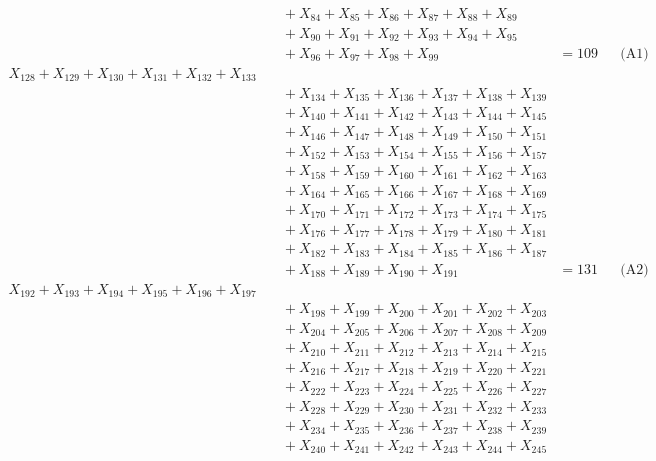 \documentclass[a4paper,10pt]{article}
\begin{document}
{\begin{align}
&\quad  + X_{84} + X_{85} + X_{86} + X_{87} + X_{88} + X_{89} \\[0.5ex]
&\quad  + X_{90} + X_{91} + X_{92} + X_{93} + X_{94} + X_{95} \\[0.5ex]
&\quad  + X_{96} + X_{97} + X_{98} + X_{99} &= 109 && \text{(A1)} \\
X_{128} + X_{129} + X_{130} + X_{131} + X_{132} + X_{133} \\[0.5ex]
&\quad  + X_{134} + X_{135} + X_{136} + X_{137} + X_{138} + X_{139} \\[0.5ex]
&\quad  + X_{140} + X_{141} + X_{142} + X_{143} + X_{144} + X_{145} \\[0.5ex]
&\quad  + X_{146} + X_{147} + X_{148} + X_{149} + X_{150} + X_{151} \\[0.5ex]
&\quad  + X_{152} + X_{153} + X_{154} + X_{155} + X_{156} + X_{157} \\[0.5ex]
&\quad  + X_{158} + X_{159} + X_{160} + X_{161} + X_{162} + X_{163} \\[0.5ex]
&\quad  + X_{164} + X_{165} + X_{166} + X_{167} + X_{168} + X_{169} \\[0.5ex]
&\quad  + X_{170} + X_{171} + X_{172} + X_{173} + X_{174} + X_{175} \\[0.5ex]
&\quad  + X_{176} + X_{177} + X_{178} + X_{179} + X_{180} + X_{181} \\[0.5ex]
&\quad  + X_{182} + X_{183} + X_{184} + X_{185} + X_{186} + X_{187} \\[0.5ex]
&\quad  + X_{188} + X_{189} + X_{190} + X_{191} &= 131 && \text{(A2)} \\
X_{192} + X_{193} + X_{194} + X_{195} + X_{196} + X_{197} \\[0.5ex]
&\quad  + X_{198} + X_{199} + X_{200} + X_{201} + X_{202} + X_{203} \\[0.5ex]
&\quad  + X_{204} + X_{205} + X_{206} + X_{207} + X_{208} + X_{209} \\[0.5ex]
&\quad  + X_{210} + X_{211} + X_{212} + X_{213} + X_{214} + X_{215} \\[0.5ex]
&\quad  + X_{216} + X_{217} + X_{218} + X_{219} + X_{220} + X_{221} \\[0.5ex]
&\quad  + X_{222} + X_{223} + X_{224} + X_{225} + X_{226} + X_{227} \\[0.5ex]
&\quad  + X_{228} + X_{229} + X_{230} + X_{231} + X_{232} + X_{233} \\[0.5ex]
&\quad  + X_{234} + X_{235} + X_{236} + X_{237} + X_{238} + X_{239} \\[0.5ex]
&\quad  + X_{240} + X_{241} + X_{242} + X_{243} + X_{244} + X_{245} \\[0.5ex]

\end{align}}
\end{document}

